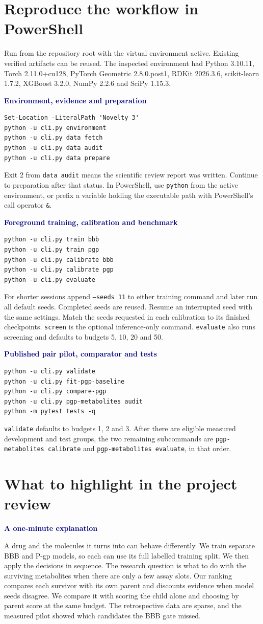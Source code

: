 \documentclass[11pt,a4paper]{article}
\newcommand{\code}[1]{\nolinkurl{#1}}
\newcommand{\cmd}[1]{\texttt{#1}}
\newcommand{\lead}[1]{\par\smallskip\textbf{\textcolor{Navy}{#1}}\par\nobreak}
\newcommand{\pagehead}[1]{\clearpage\section{#1}}
\newcommand{\callout}[1]{\par\smallskip\noindent\colorbox{Pale}{\parbox{\dimexpr\linewidth-2\fboxsep\relax}{\vspace{3pt}#1\vspace{3pt}}}\par\smallskip}
\begin{document}
\pagehead{Reproduce the workflow in PowerShell}
Run from the repository root with the virtual environment active. Existing verified artifacts can be reused. The inspected environment had Python 3.10.11, Torch 2.11.0+cu128, PyTorch Geometric 2.8.0.post1, RDKit 2026.3.6, scikit-learn 1.7.2, XGBoost 3.2.0, NumPy 2.2.6 and SciPy 1.15.3.

\lead{Environment, evidence and preparation}
\begin{verbatim}
Set-Location -LiteralPath 'Novelty 3'
python -u cli.py environment
python -u cli.py data fetch
python -u cli.py data audit
python -u cli.py data prepare
\end{verbatim}
Exit 2 from \cmd{data audit} means the scientific review report was written. Continue to preparation after that status. In PowerShell, use \code{python} from the active environment, or prefix a variable holding the executable path with PowerShell's call operator \texttt{\&}.

\lead{Foreground training, calibration and benchmark}
\begin{verbatim}
python -u cli.py train bbb
python -u cli.py train pgp
python -u cli.py calibrate bbb
python -u cli.py calibrate pgp
python -u cli.py evaluate
\end{verbatim}
For shorter sessions append \cmd{--seeds 11} to either training command and later run all default seeds. Completed seeds are reused. Resume an interrupted seed with the same settings. Match the seeds requested in each calibration to its finished checkpoints. \code{screen} is the optional inference-only command. \code{evaluate} also runs screening and defaults to budgets 5, 10, 20 and 50.

\lead{Published pair pilot, comparator and tests}
\begin{verbatim}
python -u cli.py validate
python -u cli.py fit-pgp-baseline
python -u cli.py compare-pgp
python -u cli.py pgp-metabolites audit
python -m pytest tests -q
\end{verbatim}
\code{validate} defaults to budgets 1, 2 and 3. After there are eligible measured development and test groups, the two remaining subcommands are \cmd{pgp-metabolites calibrate} and \cmd{pgp-metabolites evaluate}, in that order.

\pagehead{What to highlight in the project review}\label{sec:review}
\lead{A one-minute explanation}
\callout{A drug and the molecules it turns into can behave differently. We train separate BBB and P-gp models, so each can use its full labelled training split. We then apply the decisions in sequence. The research question is what to do with the surviving metabolites when there are only a few assay slots. Our ranking compares each survivor with its own parent and discounts evidence when model seeds disagree. We compare it with scoring the child alone and choosing by parent score at the same budget. The retrospective data are sparse, and the measured pilot showed which candidates the BBB gate missed.}
\end{document}
